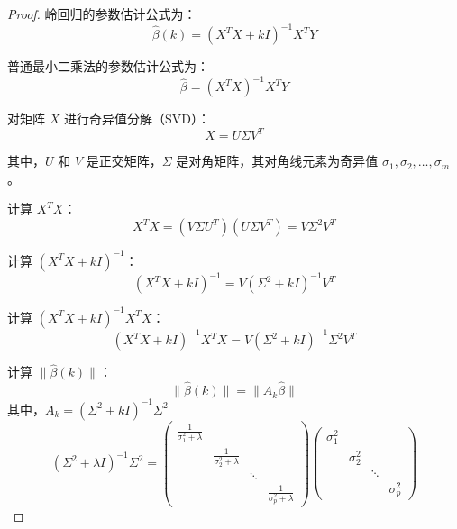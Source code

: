 \documentclass[lang=cn,11pt,a4paper]{elegantpaper}
\begin{document}
        \begin{proof}
        岭回归的参数估计公式为：
        \begin{equation}
        \hat{\beta}(k) = (X^T X + k I)^{-1} X^T Y
        \end{equation}
        
        普通最小二乘法的参数估计公式为：
        \begin{equation}
        \hat{\beta} = (X^T X)^{-1} X^T Y
        \end{equation}
        
        对矩阵 \( X \) 进行奇异值分解（SVD）：
        \begin{equation}
        X = U \Sigma V^T
        \end{equation}
        
        其中，\( U \) 和 \( V \) 是正交矩阵，\( \Sigma \) 是对角矩阵，其对角线元素为奇异值 \(\sigma_1, \sigma_2, \dots, \sigma_m\)。
        
        计算 \( X^T X \)：
        \begin{equation}
        X^T X = (V \Sigma U^T)(U \Sigma V^T) = V \Sigma^2 V^T
        \end{equation}
        
        计算 \( (X^T X + k I)^{-1} \)：
        \begin{equation}
        (X^T X + k I)^{-1} = V (\Sigma^2 + k I)^{-1} V^T
        \end{equation}
        
        计算 \( (X^T X + k I)^{-1} X^T X \)：
        \begin{equation}
        (X^T X + k I)^{-1} X^T X = V (\Sigma^2 + k I)^{-1} \Sigma^2 V^T
        \end{equation}
        
        计算 \(\| \hat{\beta}(k) \|\)：
        \begin{equation}
        \| \hat{\beta}(k) \| = \| A_k \hat{\beta} \|
        \end{equation}
        其中，\( A_k = (\Sigma^2 + k I)^{-1} \Sigma^2 \)
        \begin{equation}
            (\Sigma^2 + \lambda I)^{-1} \Sigma^2 = \begin{pmatrix}
            \frac{1}{\sigma_1^2 + \lambda} & & & \\
            & \frac{1}{\sigma_2^2 + \lambda} & & \\
            & & \ddots & \\
            & & & \frac{1}{\sigma_p^2 + \lambda}
            \end{pmatrix}
            \begin{pmatrix}
            \sigma_1^2 & & & \\
            & \sigma_2^2 & & \\
            & & \ddots & \\
            & & & \sigma_p^2
            \end{pmatrix}
            \end{equation}
            

\end{proof}
\end{document}
